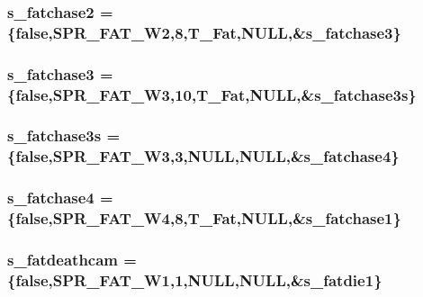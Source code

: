 \label{WL__ACT2_8C_a5340eb27beeb3b953fdfb07c6edb204a}
\hypertarget{WL__ACT2_8C_a4225091f6043a6880b6af10c9a80f857}{
\subsubsection[{s\_\-fatchase2}]{ {\bf s\_\-fatchase2} = \{false,SPR\_\-FAT\_\-W2,8,T\_\-Fat,NULL,\&{\bf s\_\-fatchase3}\}}}
\label{WL__ACT2_8C_a4225091f6043a6880b6af10c9a80f857}
\hypertarget{WL__ACT2_8C_ae098c545b121d2159fbf896e34c7a406}{
\subsubsection[{s\_\-fatchase3}]{ {\bf s\_\-fatchase3} = \{false,SPR\_\-FAT\_\-W3,10,T\_\-Fat,NULL,\&{\bf s\_\-fatchase3s}\}}}
\label{WL__ACT2_8C_ae098c545b121d2159fbf896e34c7a406}
\hypertarget{WL__ACT2_8C_af9ee0d352f015413967f94307deb8273}{
\subsubsection[{s\_\-fatchase3s}]{ {\bf s\_\-fatchase3s} = \{false,SPR\_\-FAT\_\-W3,3,NULL,NULL,\&{\bf s\_\-fatchase4}\}}}
\label{WL__ACT2_8C_af9ee0d352f015413967f94307deb8273}
\hypertarget{WL__ACT2_8C_a4a40863cb1d0f011a66bd6bddf787ee0}{
\subsubsection[{s\_\-fatchase4}]{ {\bf s\_\-fatchase4} = \{false,SPR\_\-FAT\_\-W4,8,T\_\-Fat,NULL,\&{\bf s\_\-fatchase1}\}}}
\label{WL__ACT2_8C_a4a40863cb1d0f011a66bd6bddf787ee0}
\hypertarget{WL__ACT2_8C_ae2e05461bc31bea7fb647a6710ba6924}{
\subsubsection[{s\_\-fatdeathcam}]{ {\bf s\_\-fatdeathcam} = \{false,SPR\_\-FAT\_\-W1,1,NULL,NULL,\&{\bf s\_\-fatdie1}\}}}
